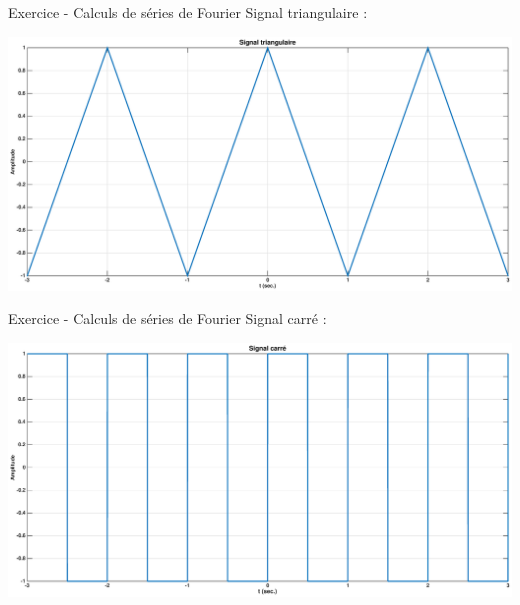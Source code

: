 \documentclass[a4paper,11pt]{beamer}
\newcounter{exampleBlockCounter}
\begin{document}
\begin{frame}
\begin{exampleblock}{Exercice  - Calculs de séries
de Fourier}
\centering
Signal triangulaire :
\vspace{0.25cm}

\includegraphics[scale=0.15]{Matlab/SignalTriangulaire.eps}
\end{exampleblock}
\end{frame}
 
\begin{frame}
\begin{exampleblock}{Exercice  - Calculs de séries
de Fourier}
\centering
Signal carré :
\vspace{0.25cm}

\includegraphics[scale=0.15]{Matlab/SignalCarre.eps}
\end{exampleblock}
\end{frame}
 
\end{document}
